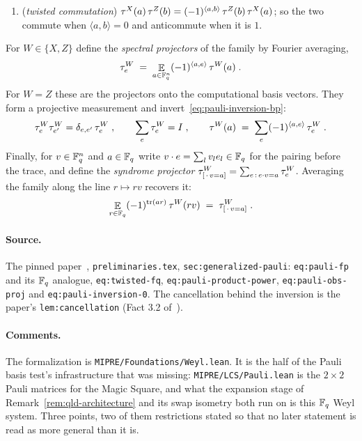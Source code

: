 \begin{definition}
\begin{enumerate}
  hence a $\pm 1$-observable and a unitary;
\item (\emph{twisted commutation})
  $\tau^X(a)\, \tau^Z(b) = (-1)^{\langle a, b \rangle}\, \tau^Z(b)\, \tau^X(a)$; so the two commute
  when $\langle a, b\rangle = 0$ and anticommute when it is $1$.
\end{enumerate}
For $W \in \{X, Z\}$ define the \emph{spectral projectors} of the family by Fourier averaging,
\begin{equation}
  \label{eq:pauli-inversion-bp}
  \tau^W_e \;=\; \mathop{\mathbb{E}}_{a \in \mathbb{F}_q^n} (-1)^{\langle a, e \rangle}\, \tau^W(a)\;.
\end{equation}
For $W = Z$ these are the projectors onto the computational basis vectors. They form a projective
measurement and invert~\eqref{eq:pauli-inversion-bp}:
\begin{equation}
  \label{eq:pauli-obs-proj-bp}
  \tau^W_e \tau^W_{e'} = \delta_{e, e'}\, \tau^W_e\;, \qquad
  \sum_e \tau^W_e = I\;, \qquad
  \tau^W(a) \;=\; \sum_{e} (-1)^{\langle a, e\rangle}\, \tau^W_e\;.
\end{equation}
Finally, for $v \in \mathbb{F}_q^n$ and $a \in \mathbb{F}_q$ write $v \cdot e = \sum_l v_l e_l \in \mathbb{F}_q$ for the
pairing before the trace, and define the \emph{syndrome projector}
$\tau^W_{[\,\cdot\, v = a]} = \sum_{e \,:\, e \cdot v = a} \tau^W_e$. Averaging the family along the
line $r \mapsto r v$ recovers it:
\begin{equation}
  \label{eq:pauli-line-bp}
  \mathop{\mathbb{E}}_{r \in \mathbb{F}_q} (-1)^{\operatorname{tr}(a r)}\, \tau^W(r v) \;=\; \tau^W_{[\,\cdot\, v = a]}\;.
\end{equation}
\end{definition}

\paragraph{Source.} The pinned paper~\cite{AuditSync26}, \texttt{preliminaries.tex},
\texttt{sec:generalized-pauli}: \texttt{eq:pauli-fp} and its $\mathbb{F}_q$ analogue,
\texttt{eq:twisted-fq}, \texttt{eq:pauli-product-power}, \texttt{eq:pauli-obs-proj} and
\texttt{eq:pauli-inversion-0}. The cancellation behind the inversion is the paper's
\texttt{lem:cancellation} (Fact 3.2 of~\cite{NW19}).

\paragraph{Comments.} The formalization is \texttt{MIPRE/Foundations/Weyl.lean}. It is the half of
the Pauli basis test's infrastructure that was missing: \texttt{MIPRE/LCS/Pauli.lean} is the
$2 \times 2$ Pauli matrices for the Magic Square, and what the expansion stage of
Remark~\ref{rem:qld-architecture} and its swap isometry both run on is this $\mathbb{F}_q$ Weyl system.
Three points, two of them restrictions stated so that no later statement is read as more general
than it is.

